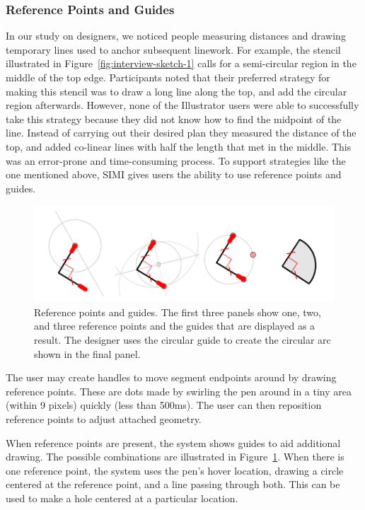 \documentclass{article}
\begin{document}

\subsubsection{Reference Points and Guides}


In our study on designers, we noticed people measuring distances and
drawing temporary lines used to anchor subsequent linework. For
example, the stencil illustrated in
Figure~\ref{fig:interview-sketch-1} calls for a semi-circular region
in the middle of the top edge. Participants noted that their preferred
strategy for making this stencil was to draw a long line along the
top, and add the circular region afterwards. However, none of the
Illustrator users were able to successfully take this strategy because
they did not know how to find the midpoint of the line. Instead of
carrying out their desired plan they measured the distance of the top,
and added co-linear lines with half the length that met in the
middle. This was an error-prone and time-consuming process. To support
strategies like the one mentioned above, SIMI gives users the ability
to use reference points and guides.

\begin{figure}[h]
  \centering
  \includegraphics[width=0.9\linewidth]{img/guides-all.pdf}
  \caption{Reference points and guides. The first three panels show
    one, two, and three reference points and the guides that are
    displayed as a result. The designer uses the circular guide to
    create the circular arc shown in the final panel.}
  \label{fig:guides}
\end{figure}

The user may create handles to move segment endpoints around by
drawing reference points. These are dots made by swirling the pen
around in a tiny area (within 9 pixels) quickly (less than 500ms). The
user can then reposition reference points to adjust attached geometry.

When reference points are present, the system shows guides to aid
additional drawing. The possible combinations are illustrated in
Figure~\ref{fig:guides}. When there is one reference point, the system
uses the pen's hover location, drawing a circle centered at the
reference point, and a line passing through both. This can be used to
make a hole centered at a particular location.
\end{document}
